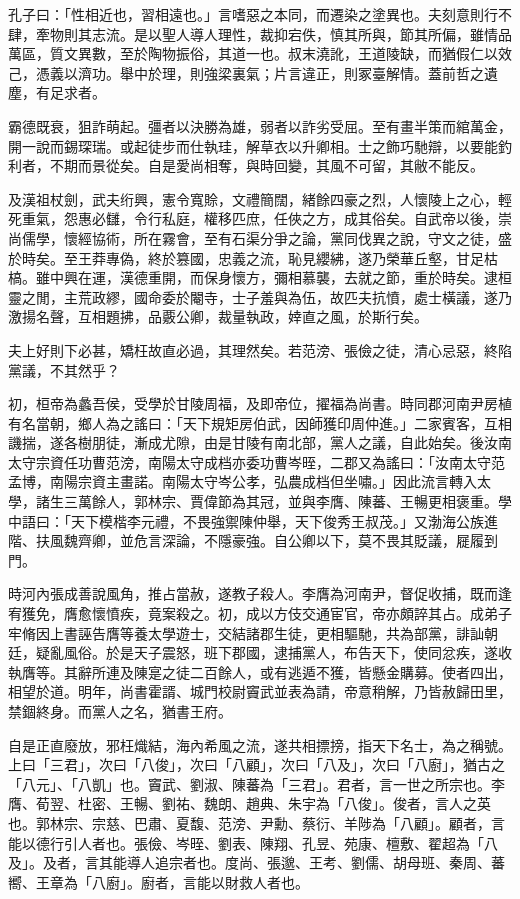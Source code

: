 
\begin{pinyinscope}
孔子曰：「性相近也，習相遠也。」言嗜惡之本同，而遷染之塗異也。夫刻意則行不肆，牽物則其志流。是以聖人導人理性，裁抑宕佚，慎其所與，節其所偏，雖情品萬區，質文異數，至於陶物振俗，其道一也。叔末澆訛，王道陵缺，而猶假仁以效己，憑義以濟功。舉中於理，則強梁裏氣；片言違正，則冢臺解情。蓋前哲之遺塵，有足求者。

霸德既衰，狙詐萌起。彊者以決勝為雄，弱者以詐劣受屈。至有畫半策而綰萬金，開一說而錫琛瑞。或起徒步而仕執珪，解草衣以升卿相。士之飾巧馳辯，以要能釣利者，不期而景從矣。自是愛尚相奪，與時回變，其風不可留，其敝不能反。

及漢祖杖劍，武夫绗興，憲令寬賒，文禮簡闊，緒餘四豪之烈，人懷陵上之心，輕死重氣，怨惠必讎，令行私庭，權移匹庶，任俠之方，成其俗矣。自武帝以後，崇尚儒學，懷經協術，所在霧會，至有石渠分爭之論，黨同伐異之說，守文之徒，盛於時矣。至王莽專偽，終於篡國，忠義之流，恥見纓紼，遂乃榮華丘壑，甘足枯槁。雖中興在運，漢德重開，而保身懷方，彌相慕襲，去就之節，重於時矣。逮桓靈之閒，主荒政繆，國命委於閹寺，士子羞與為伍，故匹夫抗憤，處士橫議，遂乃激揚名聲，互相題拂，品覈公卿，裁量執政，婞直之風，於斯行矣。

夫上好則下必甚，矯枉故直必過，其理然矣。若范滂、張儉之徒，清心忌惡，終陷黨議，不其然乎？

初，桓帝為蠡吾侯，受學於甘陵周福，及即帝位，擢福為尚書。時同郡河南尹房植有名當朝，鄉人為之謠曰：「天下規矩房伯武，因師獲印周仲進。」二家賓客，互相譏揣，遂各樹朋徒，漸成尤隙，由是甘陵有南北部，黨人之議，自此始矣。後汝南太守宗資任功曹范滂，南陽太守成档亦委功曹岑晊，二郡又為謠曰：「汝南太守范孟博，南陽宗資主畫諾。南陽太守岑公孝，弘農成档但坐嘯。」因此流言轉入太學，諸生三萬餘人，郭林宗、賈偉節為其冠，並與李膺、陳蕃、王暢更相褒重。學中語曰：「天下模楷李元禮，不畏強禦陳仲舉，天下俊秀王叔茂。」又渤海公族進階、扶風魏齊卿，並危言深論，不隱豪強。自公卿以下，莫不畏其貶議，屣履到門。

時河內張成善說風角，推占當赦，遂教子殺人。李膺為河南尹，督促收捕，既而逢宥獲免，膺愈懷憤疾，竟案殺之。初，成以方伎交通宦官，帝亦頗誶其占。成弟子牢脩因上書誣告膺等養太學遊士，交結諸郡生徒，更相驅馳，共為部黨，誹訕朝廷，疑亂風俗。於是天子震怒，班下郡國，逮捕黨人，布告天下，使同忿疾，遂收執膺等。其辭所連及陳寔之徒二百餘人，或有逃遁不獲，皆懸金購募。使者四出，相望於道。明年，尚書霍諝、城門校尉竇武並表為請，帝意稍解，乃皆赦歸田里，禁錮終身。而黨人之名，猶書王府。

自是正直廢放，邪枉熾結，海內希風之流，遂共相摽搒，指天下名士，為之稱號。上曰「三君」，次曰「八俊」，次曰「八顧」，次曰「八及」，次曰「八廚」，猶古之「八元」、「八凱」也。竇武、劉淑、陳蕃為「三君」。君者，言一世之所宗也。李膺、荀翌、杜密、王暢、劉祐、魏朗、趙典、朱宇為「八俊」。俊者，言人之英也。郭林宗、宗慈、巴肅、夏馥、范滂、尹勳、蔡衍、羊陟為「八顧」。顧者，言能以德行引人者也。張儉、岑晊、劉表、陳翔、孔昱、苑康、檀敷、翟超為「八及」。及者，言其能導人追宗者也。度尚、張邈、王考、劉儒、胡母班、秦周、蕃嚮、王章為「八廚」。廚者，言能以財救人者也。


\end{pinyinscope}
